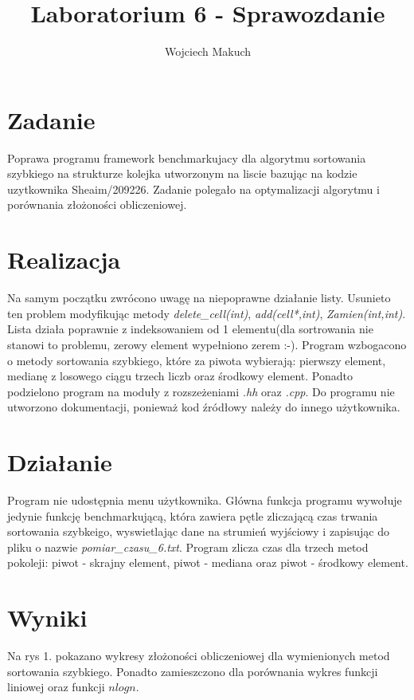 \documentclass[11pt,a4paper]{article}
\title{Laboratorium 6 - Sprawozdanie}
\author{Wojciech Makuch}
\begin{document}
\maketitle
\section{Zadanie}
Poprawa programu framework benchmarkujacy dla algorytmu sortowania szybkiego na strukturze kolejka utworzonym na liscie bazując na kodzie uzytkownika Sheaim/209226. Zadanie polegało na optymalizacji algorytmu i porównania złożoności obliczeniowej.
\section{Realizacja}
Na samym początku zwrócono uwagę na niepoprawne działanie listy. Usunieto ten problem modyfikując metody \textsl{delete\_cell(int)}, \textsl{add(cell*,int)}, \textsl{Zamien(int,int)}. Lista działa poprawnie z indeksowaniem od 1 elementu(dla sortrowania nie stanowi to problemu, zerowy element wypełniono zerem :-). Program wzbogacono o metody sortowania szybkiego, które za piwota wybierają: pierwszy element, medianę z losowego ciągu trzech liczb oraz środkowy element. Ponadto podzielono program na moduły z rozszeżeniami \textsl{.hh} oraz \textsl{.cpp}. Do programu nie utworzono dokumentacji, ponieważ kod źródłowy należy do innego użytkownika.



\section{Działanie}
Program nie udostępnia menu użytkownika. Główna funkcja programu wywołuje jedynie funkcję benchmarkującą, która zawiera pętle zliczającą czas trwania sortowania szybkeigo, wyswietlając dane na strumień wyjściowy i zapisując do pliku o nazwie \textsl{pomiar\_czasu\_6.txt}. Program zlicza czas dla trzech metod pokoleji: piwot - skrajny element, piwot - mediana oraz piwot - środkowy element.

\section{Wyniki}
Na rys 1. pokazano wykresy złożoności obliczeniowej dla wymienionych metod sortowania szybkiego. Ponadto zamieszczono dla porównania wykres funkcji liniowej oraz funkcji $n log n$. 
\end{document}
